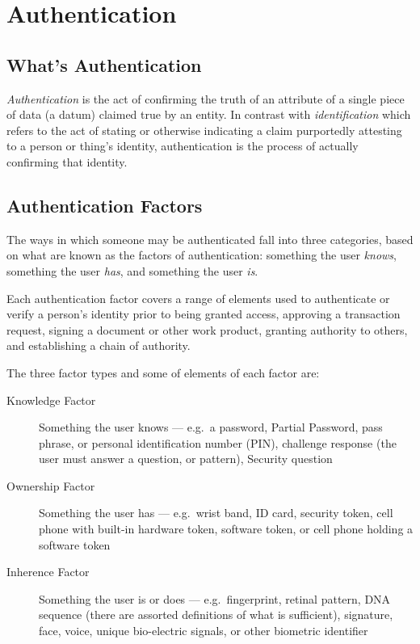 
\chapter{Authentication}

\section{What's Authentication}

\emph{Authentication} is the act of confirming the truth of an attribute
of a single piece of data (a datum) claimed true by an entity. In
contrast with \emph{identification} which refers to the act of stating
or otherwise indicating a claim purportedly attesting to a person or
thing's identity, authentication is the process of actually confirming
that identity.


\section{Authentication Factors}

The ways in which someone may be authenticated fall into three
categories, based on what are known as the factors of authentication:
something the user \emph{knows}, something the user \emph{has}, and
something the user \emph{is}.

Each authentication factor covers a range of elements used to
authenticate or verify a person's identity prior to being granted
access, approving a transaction request, signing a document or other
work product, granting authority to others, and establishing a chain of
authority.


The three factor types and some of elements of each factor are:

\begin{description}

    \item[Knowledge Factor] Something the user knows --- e.g.\ a 
        password, Partial Password, pass phrase, or personal identification 
        number (PIN), challenge response (the user must answer a question, 
        or pattern), Security question

    \item[Ownership Factor] Something the user has --- e.g.\ wrist band, 
        ID card, security token, cell phone with built-in hardware token, 
        software token, or cell phone holding a software token

    \item[Inherence Factor] Something the user is or does --- e.g.\ 
        fingerprint, retinal pattern, DNA sequence (there are assorted 
        definitions of what is sufficient), signature, face, voice, 
        unique bio-electric signals, or other biometric identifier

\end{description}


